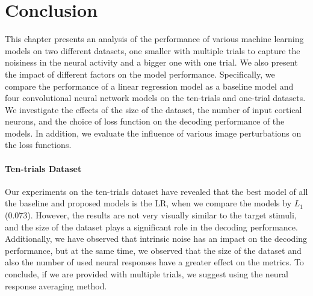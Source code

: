 \chapter{Conclusion}
\label{conclusion}
This chapter presents an analysis of the performance of various machine learning models on two different datasets, one smaller with multiple trials to capture the noisiness in the neural activity and a bigger one with one trial. We also present the impact of different factors on the model performance. Specifically, we compare the performance of a linear regression model as a baseline model and four convolutional neural network models on the ten-trials and one-trial datasets. We investigate the effects of the size of the dataset, the number of input cortical neurons, and the choice of loss function on the decoding performance of the models. In addition, we evaluate the influence of various image perturbations on the loss functions.

\subsubsection{Ten-trials Dataset}

Our experiments on the ten-trials dataset have revealed that the best model of all the baseline and proposed models is the LR, when we compare the models by $L_1$ ($0.073$). However, the results are not very visually similar to the target stimuli, and the size of the dataset plays a significant role in the decoding performance. Additionally, we have observed that intrinsic noise has an impact on the decoding performance, but at the same time, we observed that the size of the dataset and also the number of used neural responses have a greater effect on the metrics. To conclude, if we are provided with multiple trials, we suggest using the neural response averaging method.


